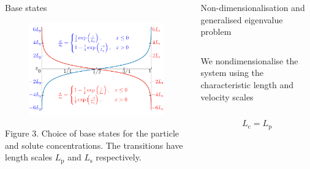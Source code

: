 \documentclass[final]{beamer} %
\begin{document}
\begin{frame}[t]
\begin{columns}[t]
\begin{column}{0.3\paperwidth}
\begin{block}{Base states}
        \begin{figure}
            \includegraphics[width=0.3\paperwidth]{base_state.pdf}
          \end{figure}

          \vspace{-1cm}

          \centering \footnotesize Figure 3. Choice of base states for the
          particle and solute concentrations. The transitions have length scales
          $L_{\text{p}}$ and $L_{\text{s}}$ respectively.
          
      \end{block}

    \end{column}

    \begin{column}{0.6\paperwidth}
      \begin{block}{Non-dimensionalisation and generalised eigenvalue problem}
        \begin{columns}[t]
          \begin{column}{0.2\paperwidth}
            \centering We nondimensionalise the system using the characteristic length and velocity scales

            \vspace{-1cm}
            
            \begin{columns}[t]
              \begin{column}{0.11\paperwidth}
                \centering
                
                $$ L_{\text{c}} = L_{\text{p}} $$
                

\end{column}
\end{columns}
\end{column}
\end{columns}
\end{block}
\end{column}
\end{columns}
\end{frame}
\end{document}
